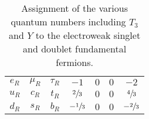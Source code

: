 \begin{table}[h]
\begin{center}
{\begin{tabular}{ccccccc}
$e_{R}$ & $\mu_{R}$ & $\tau_{R}$ & $-1$ & $0$ & $0$ & $-2$ \\
$u_{R}$ & $c_{R}$ & $t_{R}$ & $\sfrac{2}{3}$ & $0$ & $0$ & $\sfrac{4}{3}$ \\
$d_{R}$ & $s_{R}$ & $b_{R}$ & $-\sfrac{1}{3}$ & $0$ & $0$ & $-\sfrac{2}{3}$ \\
\bottomrule
\end{tabular}
}
\caption{Assignment of the various quantum numbers including $T_{3}$ and $Y$ to the electroweak singlet and doublet fundamental fermions.}
\label{tab:EWK_fermions}
\end{center}
\end{table}

